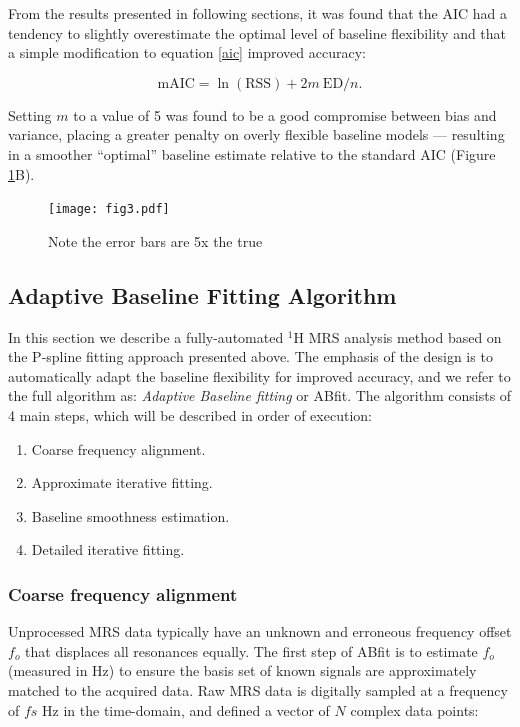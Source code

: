 \documentclass[num-refs]{wiley-article}
\begin{document}
From the results presented in following sections, it was found that the AIC had a tendency to slightly overestimate the optimal level of baseline flexibility and that a simple modification to equation \ref{aic} improved accuracy:

\begin{equation}
  \textrm{mAIC} = \ln(\textrm{RSS}) + 2 m \ \textrm{ED} / n.
  \label{maic}
\end{equation}

Setting $m$ to a value of 5 was found to be a good compromise between bias and variance, placing a greater penalty on overly flexible baseline models --- resulting in a smoother ``optimal'' baseline estimate relative to the standard AIC (Figure \ref{mrs_bl_simple}B).

\begin{figure}
  \begin{center}
    \texttt{[image: fig3.pdf]}
    \caption{Note the error bars are 5x the true}
    \label{mrs_bl_simple}
  \end{center}
\end{figure}

\subsection{Adaptive Baseline Fitting Algorithm}
In this section we describe a fully-automated $^1\mathrm{H}$ MRS analysis method based on the P-spline fitting approach presented above. The emphasis of the design is to automatically adapt the baseline flexibility for improved accuracy, and we refer to the full algorithm as: \textit{Adaptive Baseline fitting} or ABfit. The algorithm consists of 4 main steps, which will be described in order of execution:

\begin{enumerate}
  \item Coarse frequency alignment.
  \item Approximate iterative fitting.
  \item Baseline smoothness estimation.
  \item Detailed iterative fitting.
\end{enumerate}

\subsubsection{Coarse frequency alignment}
Unprocessed MRS data typically have an unknown and erroneous frequency offset $f_{o}$ that displaces all resonances equally. The first step of ABfit is to estimate $f_{o}$ (measured in Hz) to ensure the basis set of known signals are approximately matched to the acquired data. Raw MRS data is digitally sampled at a frequency of $\mathit{fs}$ Hz in the time-domain, and defined a vector of $N$ complex data points:
\end{document}
